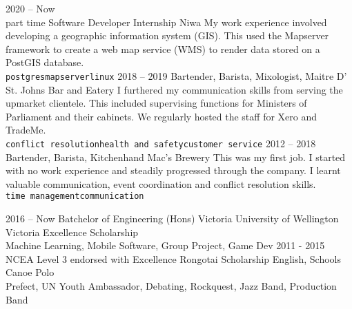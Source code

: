 \documentclass[9pt]{developercv} %
\begin{document}
\begin{entrylist}
	\entry
		{2020 -- Now\\\footnotesize{part time}}
		{Software Developer Internship}
		{Niwa}
		{
			My work experience involved developing a geographic information system (GIS). This used the Mapserver framework to create a web map service (WMS) to render data stored on a PostGIS database.
			\\
			\texttt{postgres}\slashsep\texttt{mapserver}\slashsep\texttt{linux}
		}
	\entry
		{2018 -- 2019}
		{Bartender, Barista, Mixologist, Maitre D'}
		{St. Johns Bar and Eatery}
		{
			I furthered my communication skills from serving the upmarket clientele. This included supervising functions for Ministers of Parliament and their cabinets. We regularly hosted the staff for Xero and TradeMe.
			\\
			\texttt{conflict resolution}\slashsep\texttt{health and safety}\slashsep\texttt{customer service}
		}
	\entry
		{2012 -- 2018}
		{Bartender, Barista, Kitchenhand}
		{Mac's Brewery}
		{
			This was my first job. I started with no work experience and steadily progressed through the company. I learnt valuable communication, event coordination and conflict resolution skills.
			\\
			\texttt{time management}\slashsep\texttt{communication}
		}
\end{entrylist}



\begin{entrylist}
	\entry
		{2016 -- Now}
		{Batchelor of Engineering (Hons)}
		{Victoria University of Wellington}
		{
			Victoria Excellence Scholarship \\
			Machine Learning, Mobile Software, Group Project, Game Dev
		}
	\entry
		{2011 - 2015}
		{NCEA Level 3 endorsed with Excellence}
		{Rongotai}
		{
			Scholarship English, Schools Canoe Polo \\
			Prefect, UN Youth Ambassador, Debating, Rockquest, Jazz Band, Production Band
		}
\end{entrylist}

\end{document}
